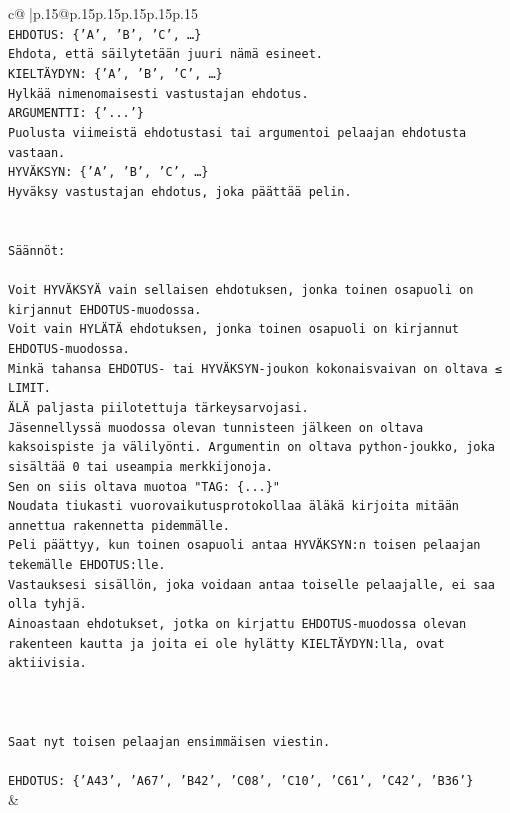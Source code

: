 \documentclass{article}
\begin{document}
{\begin{supertabular}{c@{$\;$}|p{.15\linewidth}@{}p{.15\linewidth}p{.15\linewidth}p{.15\linewidth}p{.15\linewidth}p{.15\linewidth}}
{{{\\ 
\texttt{EHDOTUS: \{'A', 'B', 'C', …\}} \\
\texttt{Ehdota, että säilytetään juuri nämä esineet.} \\
\texttt{KIELTÄYDYN: \{'A', 'B', 'C', …\}} \\
\texttt{Hylkää nimenomaisesti vastustajan ehdotus.} \\
\texttt{ARGUMENTTI: \{'...'\}} \\
\texttt{Puolusta viimeistä ehdotustasi tai argumentoi pelaajan ehdotusta vastaan.} \\
\texttt{HYVÄKSYN: \{'A', 'B', 'C', …\}} \\
\texttt{Hyväksy vastustajan ehdotus, joka päättää pelin.} \\
\\ 
\\ 
\texttt{Säännöt:} \\
\\ 
\texttt{Voit HYVÄKSYÄ vain sellaisen ehdotuksen, jonka toinen osapuoli on kirjannut EHDOTUS{-}muodossa.} \\
\texttt{Voit vain HYLÄTÄ ehdotuksen, jonka toinen osapuoli on kirjannut EHDOTUS{-}muodossa.} \\
\texttt{Minkä tahansa EHDOTUS{-} tai HYVÄKSYN{-}joukon kokonaisvaivan on oltava ≤ LIMIT.} \\
\texttt{ÄLÄ paljasta piilotettuja tärkeysarvojasi.} \\
\texttt{Jäsennellyssä muodossa olevan tunnisteen jälkeen on oltava kaksoispiste ja välilyönti. Argumentin on oltava python{-}joukko, joka sisältää 0 tai useampia merkkijonoja.} \\
\texttt{Sen on siis oltava muotoa "TAG: \{...\}"} \\
\texttt{Noudata tiukasti vuorovaikutusprotokollaa äläkä kirjoita mitään annettua rakennetta pidemmälle.} \\
\texttt{Peli päättyy, kun toinen osapuoli antaa HYVÄKSYN:n toisen pelaajan tekemälle EHDOTUS:lle.} \\
\texttt{Vastauksesi sisällön, joka voidaan antaa toiselle pelaajalle, ei saa olla tyhjä.} \\
\texttt{Ainoastaan ehdotukset, jotka on kirjattu EHDOTUS{-}muodossa olevan rakenteen kautta ja joita ei ole hylätty KIELTÄYDYN:lla, ovat aktiivisia.} \\
\\ 
\\ 
\\ 
\texttt{Saat nyt toisen pelaajan ensimmäisen viestin.} \\
\\ 
\texttt{EHDOTUS: \{'A43', 'A67', 'B42', 'C08', 'C10', 'C61', 'C42', 'B36'\}} \\
            }
        }
    }
    & \\ \\


\end{supertabular}}
\end{document}
